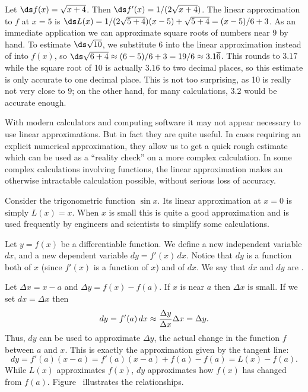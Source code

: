 \begin{example} Let $\ds f(x)=\sqrt{x+4}$. Then $\ds f'(x)=1/(2\sqrt{x+4})$.
 The linear approximation to $f$ at $x=5$ is $\ds
L(x)=1/(2\sqrt{5+4})(x-5)+\sqrt{5+4}=(x-5)/6+3$.  As an immediate
application we can approximate square roots of numbers near 9 by hand.
To estimate $\ds\sqrt{10}$, we substitute 6 into the linear
approximation instead of into $f(x)$, so
$\ds \sqrt{6+4}\approx (6-5)/6+3 = 19/6\approx 3.1\overline{6}$.
This rounds to $3.17$ while the square root of 10 is actually
$3.16$ to two decimal places, so this estimate is only accurate to one
decimal place. This is not too surprising, as 10 is really not very
close to 9; on the other hand, for many calculations, $3.2$ would be
accurate enough.
\endexam

With modern calculators and computing software it may not appear
necessary to use linear approximations. But in fact they are quite
useful. In cases requiring an explicit numerical approximation, they
allow us to get a quick rough estimate which can be used as a
``reality check'' on a more complex calculation. In some complex
calculations involving functions, the linear approximation makes an
otherwise intractable calculation possible, without serious loss of
accuracy.

\exam\relax
\label{exam:linear approximation of sine}
Consider the trigonometric function $\sin x$. Its linear approximation
at $x=0$ is simply $L(x)=x$. When $x$ is small this is quite a good
approximation and is used frequently by engineers and scientists
to simplify some calculations.
\endexam

\begin{definition} Let $y=f(x)$ be a differentiable function. We define a new
  independent variable $dx$, and a new dependent variable
  $dy=f'(x)\,dx$. Notice that $dy$ is a function both of $x$ (since
  $f'(x)$ is a function of $x$) and of $dx$.  We say that $dx$ and
  $dy$ are .  
\end{definition}

Let $\Delta x =x-a$ and $\Delta y= f(x)-f(a)$.
If $x$ is near $a$ then $\Delta x$ is small. If we set
$dx=\Delta x$ then 
$$dy = f'(a)\,dx \approx {\Delta y\over\Delta x}\Delta x = \Delta y.$$
Thus, $dy$ can be used to approximate $\Delta y$, the actual change in
the function $f$ between $a$ and $x$. This is exactly the
approximation given by the tangent line:
$$dy = f'(a)(x-a) = f'(a)(x-a)+f(a)-f(a)=L(x)-f(a).$$
While $L(x)$ approximates $f(x)$, $dy$ approximates how $f(x)$ has
changed from $f(a)$.
Figure~ illustrates the relationships.


\end{example}
